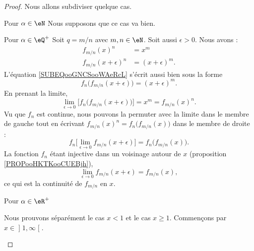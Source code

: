 \begin{proof}
    Nous allons subdiviser quelque cas.
    \begin{subproof}
        \item[Pour \( \alpha\in \eN\)]
            Nous supposons que ce cas va bien.      %
        \item[Pour \( \alpha\in \eQ^+\)]
            Soit \( q=m/n\) avec \( m,n\in \eN\). Soit aussi \( \epsilon>0\). Nous avons :
            \begin{subequations}
                \begin{align}
                    f_{m/n}(x)^n&=x^m\\
                    f_{m/n}(x+\epsilon)^n&=(x+\epsilon)^m.      \label{SUBEQooGNCSooWAeRcL}
                \end{align}
            \end{subequations}
            L'équation \eqref{SUBEQooGNCSooWAeRcL} s'écrit aussi bien sous la forme
            \begin{equation}
                f_n\big( f_{m/n}(x+\epsilon) \big)=(x+\epsilon)^m.
            \end{equation}
            En prenant la limite,
            \begin{equation}
                \lim_{\epsilon\to 0}\big[ f_n\big( f_{m/n}(x+\epsilon) \big) \big]=x^m=f_{m/n}(x)^n.
            \end{equation}
            Vu que \( f_n\) est continue, nous pouvons la permuter avec la limite dans le membre de gauche tout en écrivant \( f_{m/n}(x)^n=f_n\big( f_{m/n}(x) \big)\) dans le membre de droite :
            \begin{equation}
                f_n\big[ \lim_{\epsilon\to 0}f_{m/n}(x+\epsilon) \big]=f_n\big( f_{m/n}(x) \big).
            \end{equation}
            La fonction \( f_n\) étant injective dans un voisinage autour de \( x\) (proposition \ref{PROPooHKTKooCUEBjh}),
            \begin{equation}
                \lim_{\epsilon\to 0}f_{m/n}(x+\epsilon)=f_{m/n}(x),
            \end{equation}
            ce qui est la continuité de \( f_{m/n}\) en \( x\).

        \item[Pour \( \alpha\in \eR^+\)]

        Nous prouvons séparément le cas \( x<1\) et le cas \( x\geq 1\). Commençons par \( x\in \mathopen] 1 , \infty \mathclose[\).


\end{subproof}
\end{proof}
